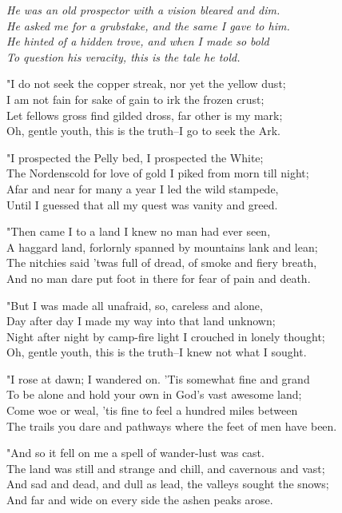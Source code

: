 
\begin{poemblock}
\textit{
\idt He was an old prospector with a vision bleared and dim.\\
\idt He asked me for a grubstake, and the same I gave to him.\\
\idt He hinted of a hidden trove, and when I made so bold\\
\idt To question his veracity, this is the tale he told.
}

"I do not seek the copper streak, nor yet the yellow dust;\\
I am not fain for sake of gain to irk the frozen crust;\\
Let fellows gross find gilded dross, far other is my mark;\\
Oh, gentle youth, this is the truth--I go to seek the Ark.

"I prospected the Pelly bed, I prospected the White;\\
The Nordenscold for love of gold I piked from morn till night;\\
Afar and near for many a year I led the wild stampede,\\
Until I guessed that all my quest was vanity and greed.

"Then came I to a land I knew no man had ever seen,\\
A haggard land, forlornly spanned by mountains lank and lean;\\
The nitchies said 'twas full of dread, of smoke and fiery breath,\\
And no man dare put foot in there for fear of pain and death.

"But I was made all unafraid, so, careless and alone,\\
Day after day I made my way into that land unknown;\\
Night after night by camp-fire light I crouched in lonely thought;\\
Oh, gentle youth, this is the truth--I knew not what I sought.

"I rose at dawn; I wandered on.  'Tis somewhat fine and grand\\
To be alone and hold your own in God's vast awesome land;\\
Come woe or weal, 'tis fine to feel a hundred miles between\\
The trails you dare and pathways where the feet of men have been.

"And so it fell on me a spell of wander-lust was cast.\\
The land was still and strange and chill, and cavernous and vast;\\
And sad and dead, and dull as lead, the valleys sought the snows;\\
And far and wide on every side the ashen peaks arose.


\end{poemblock}
